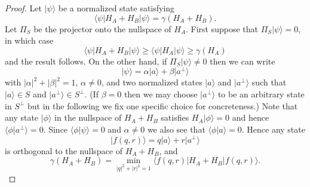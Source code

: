 \documentclass[../thesis-main/thesis-main]{subfiles}
\begin{document}
\begin{proof}
Let $|\psi\rangle$ be a normalized state satisfying 
\begin{equation}
\langle\psi|H_{A}+H_{B}|\psi\rangle=\gamma(H_{A}+H_{B}).
\end{equation}
Let $\Pi_{S}$ be the projector onto the nullspace of $H_{A}$. First suppose that $\Pi_{S}|\psi\rangle=0$, in which case 
\begin{equation}
\langle\psi|H_{A}+H_{B}|\psi\rangle\geq\langle\psi|H_{A}|\psi\rangle\geq\gamma(H_{A})
\end{equation}
and the result follows. On the other hand, if $\Pi_{S}|\psi\rangle\neq0$ then we can write 
\begin{equation}
|\psi\rangle=\alpha|a\rangle+\beta|a^{\perp}\rangle
\end{equation}
with $|\alpha|^{2}+|\beta|^{2}=1$, $\alpha\neq0$, and two normalized states $|a\rangle$ and $|a^{\perp}\rangle$ such that $|a\rangle\in S$ and $|a^{\perp}\rangle\in S^{\perp}$. (If $\beta=0$ then we may choose $|a^{\perp}\rangle$ to be an arbitrary state in $S^{\perp}$ but in the following we fix one specific choice for concreteness.) Note that any state $|\phi\rangle$ in the nullspace of $H_{A}+H_{B}$ satisfies $H_{A}|\phi\rangle=0$ and hence $\langle\phi|a^{\perp}\rangle=0$. Since $\langle\phi|\psi\rangle=0$ and $\alpha\neq0$ we also see that $\langle\phi|a\rangle=0$. Hence any state
\begin{equation}
|f(q,r)\rangle=q|a\rangle+r|a^{\perp}\rangle
\end{equation}
is orthogonal to the nullspace of $H_{A}+H_{B}$, and
\begin{equation}
\gamma(H_{A}+H_{B})=\min_{|q|^{2}+|r|^{2}=1}\langle f(q,r)|H_{A}+H_{B}|f(q,r)\rangle.
\end{equation}


\end{proof}
\end{document}

